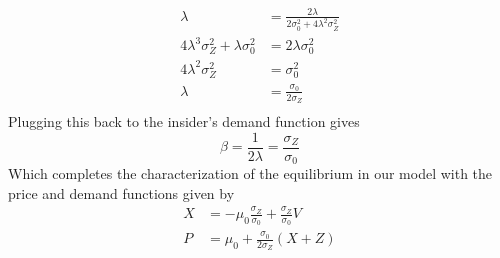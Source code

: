 \begin{solution}
    \begin{align*}
        \lambda & = \frac{2\lambda}{2\sigma_0^2 + 4\lambda^2\sigma_Z^2} \\
        4\lambda^3 \sigma_Z^2 + \lambda \sigma_0^2 & = 2\lambda \sigma_0^2 \\
        4\lambda^2 \sigma_Z^2 & = \sigma_0^2 \\ 
        \lambda & = \frac{\sigma_0}{2\sigma_Z} \\
    \end{align*}
    Plugging this back to the insider's demand function gives
    \[
        \beta = \frac{1}{2\lambda} = \frac{\sigma_Z}{\sigma_0}
    \]
    Which completes the characterization of the equilibrium in our model with the price and demand functions given by
    \begin{equation}
        \tag{Eq.}
        \begin{aligned}
            X & = -\mu_0\frac{\sigma_Z}{\sigma_0} + \frac{\sigma_Z}{\sigma_0}V \\
            P & = \mu_0 + \frac{\sigma_0}{2\sigma_Z}(X+Z)
        \end{aligned}
    \end{equation}
\end{solution}